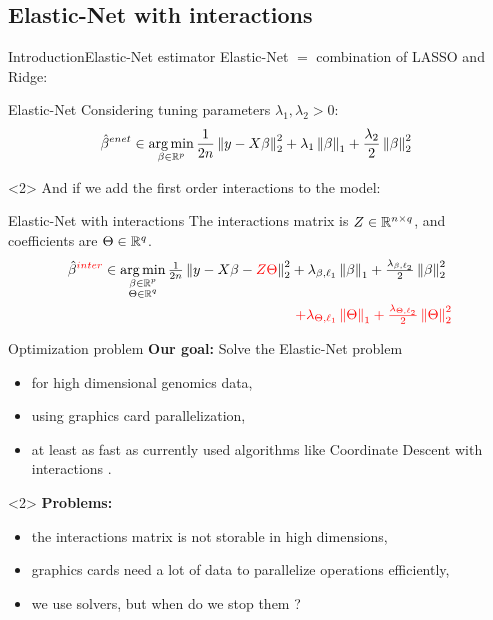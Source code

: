 \documentclass[10pt,aspectratio=43]{beamer}
\begin{document}
\subsection*{Elastic-Net with interactions}
\begin{frame}{Introduction}{Elastic-Net estimator}
Elastic-Net  $=$ combination of LASSO  and
Ridge:
\begin{block}{Elastic-Net}
Considering tuning parameters $\lambda_1,\lambda_2>0$:
\begin{align*}
    \hat\beta^{enet} \in \mathop{\mathrm{arg\,min}}_{\beta \in \mathbb{R}^p}\frac{1}{2n}\left \lVert y - X\beta \right \rVert_2^2
    + \lambda_1 \left \lVert \beta \right \rVert_1
    + \frac{\lambda_2}{2} \left \lVert \beta \right \rVert_2^2 \enspace
\end{align*}
\end{block}
\begin{onlyenv}<2>
    And if we add the first order interactions to the model:
    \begin{block}{Elastic-Net with interactions}
    The interactions matrix is $Z\in\mathbb{R}^{n\times q}$,
     and coefficients are $\Theta\in\mathbb{R}^q$.
        \begin{align*}
        \hat\beta^{\textcolor{red}{inter}}
        \in \mathop{\mathrm{arg\,min}}_{\substack{\beta \in \mathbb{R}^p \\ \Theta \in \mathbb{R}^q}}
        \tfrac{1}{2n}\left \lVert y - X\beta - \textcolor{red}{Z\Theta} \right \rVert_2^2
        & + \lambda_{\beta,\ell_1} \left \lVert \beta \right \rVert_1
        + \tfrac{\lambda_{\beta, \ell_2}}{2} \left \lVert \beta \right \rVert_2^2 \\
        & \textcolor{red}{ ~ + \lambda_{\Theta,\ell_1} \left \lVert \Theta \right \rVert_1
        + \tfrac{\lambda_{\Theta, \ell_2}}{2} \left \lVert \Theta \right \rVert_2^2}
    \end{align*}
\end{block}
\end{onlyenv}
\end{frame}

\begin{frame}{Optimization problem}
\textbf{Our goal:} Solve the Elastic-Net problem
\begin{itemize}
    \item for high dimensional genomics data,
    \item using graphics card parallelization,
    \item at least as fast as currently used algorithms like Coordinate Descent
    with interactions .
\end{itemize}
\vspace*{0.5cm}
\begin{onlyenv}<2>
\textbf{Problems:}
    \begin{itemize}
        \item the interactions matrix is not storable in high dimensions,
        \item graphics cards need a lot of data to parallelize operations
        efficiently,
        \item we use solvers, but when do we stop them ?
    \end{itemize}
\end{onlyenv}
\end{frame}
\end{document}
